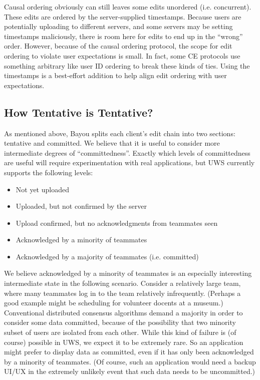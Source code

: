 \documentclass[runningheads]{llncs}
\begin{document}
Causal ordering obviously can still leaves some edits unordered (i.e. concurrent).
These edits are ordered by the server-supplied timestamps.
Because users are potentially uploading to different servers, and some servers may be setting timestamps maliciously, there is room here for edits to end up in the ``wrong'' order.
However, because of the causal ordering protocol, the scope for edit ordering to violate user expectations is small.
In fact, some CE protocols use something arbitrary like user ID ordering to break these kinds of ties.
Using the timestamps is a best-effort addition to help align edit ordering with user expectations.

\subsection{How Tentative is Tentative?}

As mentioned above, Bayou splits each client's edit chain into two sections: tentative and committed.
We believe that it is useful to consider more intermediate degrees of ``committedness''.
Exactly which levels of committedness are useful will require experimentation with real applications, but UWS currently supports the following levels:

\begin{itemize}
\item Not yet uploaded
\item Uploaded, but not confirmed by the server
\item Upload confirmed, but no acknowledgments from teammates seen
\item Acknowledged by a minority of teammates
\item Acknowledged by a majority of teammates (i.e. committed)
\end{itemize}

We believe acknowledged by a minority of teammates is an especially interesting intermediate state in the following scenario.
Consider a relatively large team, where many teammates log in to the team relatively infrequently.
(Perhaps a good example might be scheduling for volunteer docents at a museum.)
Conventional distributed consensus algorithms demand a majority in order to consider some data committed, because of the possibility that two minority subset of users are isolated from each other.
While this kind of failure is (of course) possible in UWS, we expect it to be extremely rare.
So an application might prefer to display data as committed, even if it has only been acknowledged by a minority of teammates.
(Of course, such an application would need a backup UI/UX in the extremely unlikely event that such data needs to be uncommitted.)
\end{document}
